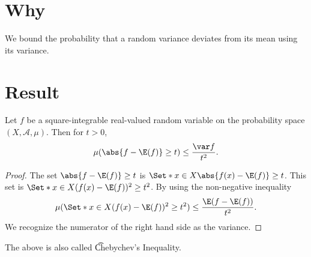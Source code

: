 

\section*{Why}

We bound the probability that a random variance deviates from its mean using its variance.

\section*{Result}

\begin{proposition}
Let $f$ be a square-integrable real-valued random variable on the probability space $(X, \mathcal{A} , \mu )$.
Then for $t > 0$,
  \[
\mu (\abs{f - \E (f)} \geq t) \leq \frac{\var f}{t^2}.
  \]
\begin{proof}The set
$\abs{f - \E (f)} \geq t$
is
$\Set*{x \in X}{ \abs{f(x) - \E (f)} \geq t}$.
This set is
$\Set*{x \in X}{({f(x) - \E (f)})^2 \geq t^2}$.
By using the non-negative inequality
  \[
\mu (\Set*{x \in X}{({f(x) - \E (f)})^2 \geq t^2}) \leq \frac{\E (f - \E (f))}{t^2}.
  \]
We recognize the numerator of the right
hand side as the variance.\end{proof}\end{proposition}
The above is also called \t{Chebychev's Inequality}.

\blankpage